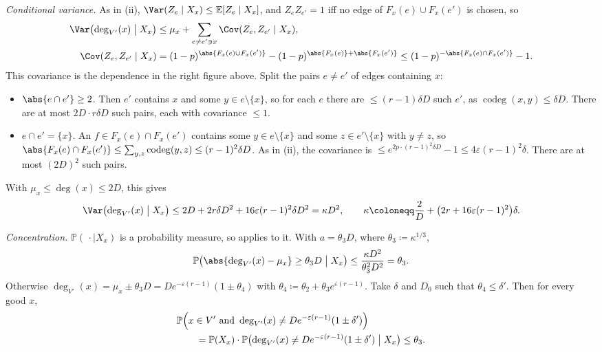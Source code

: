 \emph{Conditional variance.} As in (ii), \(\Var(Z_{e} \mid X_{x}) \le \mathbb{E}[Z_{e} \mid X_{x}]\), and \(Z_{e} Z_{e'} = 1\) iff no edge of \(F_{x}(e) \cup F_{x}(e')\) is chosen, so
\[
    \begin{aligned}
        \Var\bigl( \deg_{V'}(x) \bigm| X_{x} \bigr) &\le \mu_{x} + \sum_{e \ne e' \ni x} \Cov(Z_{e}, Z_{e'} \mid X_{x}), \\
        \Cov(Z_{e}, Z_{e'} \mid X_{x}) &= (1 - p)^{\abs{F_{x}(e) \cup F_{x}(e')}} - (1 - p)^{\abs{F_{x}(e)} + \abs{F_{x}(e')}} \le (1 - p)^{-\abs{F_{x}(e) \cap F_{x}(e')}} - 1 .
    \end{aligned}
\]
This covariance is the dependence in the right figure above. Split the pairs \(e \ne e'\) of edges containing \(x\):
\begin{itemize}
    \item \(\abs{e \cap e'} \ge 2\). Then \(e'\) contains \(x\) and some \(y \in e \setminus \{x\}\), so for each \(e\) there are \(\le (r-1)\delta D\) such \(e'\), as \(\operatorname{codeg}(x,y) \le \delta D\). There are at most \(2D \cdot r\delta D\) such pairs, each with covariance \(\le 1\).
    \item \(e \cap e' = \{x\}\). An \(f \in F_{x}(e) \cap F_{x}(e')\) contains some \(y \in e \setminus \{x\}\) and some \(z \in e' \setminus \{x\}\) with \(y \ne z\), so \(\abs{F_{x}(e) \cap F_{x}(e')} \le \sum_{y,z} \operatorname{codeg}(y,z) \le (r-1)^{2}\delta D\). As in (ii), the covariance is \(\le e^{2p \cdot (r-1)^{2}\delta D} - 1 \le 4\varepsilon (r-1)^{2}\delta\). There are at most \((2D)^{2}\) such pairs.
\end{itemize}
With \(\mu_{x} \le \deg(x) \le 2D\), this gives
\[
    \Var\bigl( \deg_{V'}(x) \bigm| X_{x} \bigr) \le 2D + 2r\delta D^{2} + 16\varepsilon (r-1)^{2}\delta D^{2} = \kappa D^{2},
    \qquad
    \kappa \coloneqq \frac{2}{D} + \bigl( 2r + 16\varepsilon (r-1)^{2} \bigr)\delta .
\]

\emph{Concentration.} \(\mathbb{P}(\,\cdot \mid X_{x})\) is a probability measure, so  applies to it. With \(a = \theta_{3} D\), where \(\theta_{3} \coloneqq \kappa^{1/3}\),
\[
    \mathbb{P}\bigl( \abs{\deg_{V'}(x) - \mu_{x}} \ge \theta_{3} D \bigm| X_{x} \bigr) \le \frac{\kappa D^{2}}{\theta_{3}^{2} D^{2}} = \theta_{3} .
\]
Otherwise \(\deg_{V'}(x) = \mu_{x} \pm \theta_{3} D = D e^{-\varepsilon(r-1)} (1 \pm \theta_{4})\) with \(\theta_{4} \coloneqq \theta_{2} + \theta_{3} e^{\varepsilon(r-1)}\). Take \(\delta\) and \(D_{0}\) such that \(\theta_{4} \le \delta'\). Then for every good \(x\),
\begin{equation}\label{eq:nibble-good-bad}
    \begin{aligned}
        &\mathbb{P}\Bigl( x \in V' \text{ and } \deg_{V'}(x) \ne D e^{-\varepsilon(r-1)} (1 \pm \delta') \Bigr) \\
        &\qquad = \mathbb{P}(X_{x}) \cdot \mathbb{P}\bigl( \deg_{V'}(x) \ne D e^{-\varepsilon(r-1)} (1 \pm \delta') \bigm| X_{x} \bigr)
        \le \theta_{3} .
    \end{aligned}
\end{equation}

